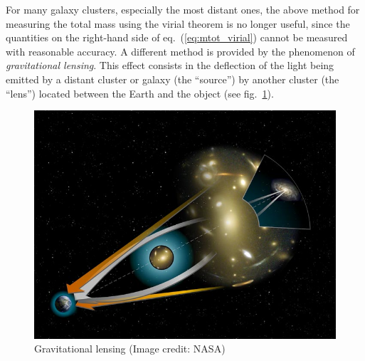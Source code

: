 \documentclass[11pt, a4paper,oneside,openright]{book}
\numberwithin{equation}{section}
\begin{document}
For many galaxy clusters, especially the most distant ones, the above method for measuring the total mass using the virial theorem is no longer useful, since the quantities on the right-hand side of eq.\ (\ref{eq:mtot_virial}) cannot be measured with reasonable accuracy. A different method is provided by the phenomenon of {\it gravitational lensing}. This effect consists in the deflection of the light being emitted by a distant cluster or galaxy (the ``source'') by another cluster (the ``lens'') located between the Earth and the object (see fig.\ \ref{fig:lec10_6}).
\begin{figure}[ht]
\begin{center}
\includegraphics[scale=0.45]{Draw/lec10_6.png}
\end{center}
\caption{Gravitational lensing (Image credit: NASA)}
\label{fig:lec10_6}
\end{figure}
\end{document}
